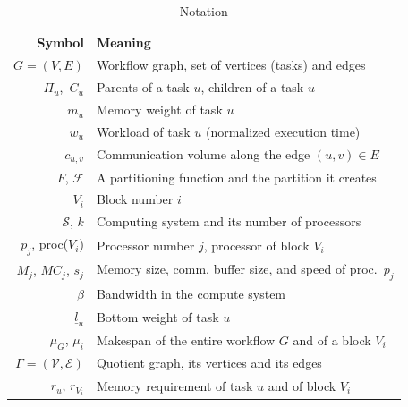 \documentclass[conference]{IEEEtran}
\newcommand{\bottomlevel}[1]{\underline{l}_{#1}} %
\newcommand{\parents}[1]{\,\Pi_{#1}}
\newcommand{\children}[1]{\,C_{#1}}
\newcommand{\cluster}{\,\mathcal{S}}
\begin{document}
    \begin{table}[h]
        \begin{center}
            \begin{tabular}{rl}
                \hline
                \textbf{Symbol}                       & \textbf{Meaning}                                         \\
                \hline
                $G = (V, E)$                          & Workflow graph, set of vertices (tasks) and edges        \\
                $\parents{u}$, $\children{u}$         & Parents of a task $u$, children of a task $u$            \\
                $m_u$                                 & Memory weight of task $u$                                \\
                $w_u$                                 & Workload of task $u$  (normalized execution time)          \\
                $c_{u,v}$                             & Communication volume along the edge $(u,v)\in E$         \\
                $F$, $\mathcal{F}$                    & A partitioning function and the partition it creates     \\
                $V_i$                                 & Block number $i$                                         \\ %
                $\cluster$, $k$                    & Computing system and its number of processors           \\
                $p_j$, proc($V_i$)                          & Processor number $j$, processor of block $V_i$                 \\
                $M_j$, $MC_j$, $s_j$                               & Memory size, comm. buffer size, and speed of proc.\ $p_j$                          \\
                $\beta$                     & Bandwidth in the compute system                                \\
                $\bottomlevel{u}$                      & Bottom weight of task $u$ \\
                $\mu_G$, $\mu_i$ & Makespan of the entire workflow $G$ and of a block $V_i$               \\
                $\Gamma = (\mathcal{V}, \mathcal{E})$                      & Quotient graph, its vertices and its edges        \\
                $r_u$, $r_{V_i}$                            & Memory requirement of task $u$ and of block $V_i$                 \\
                \hline
            \end{tabular}
        \end{center}
        \caption{Notation} \label{tabnotation}
    \end{table}
\end{document}
